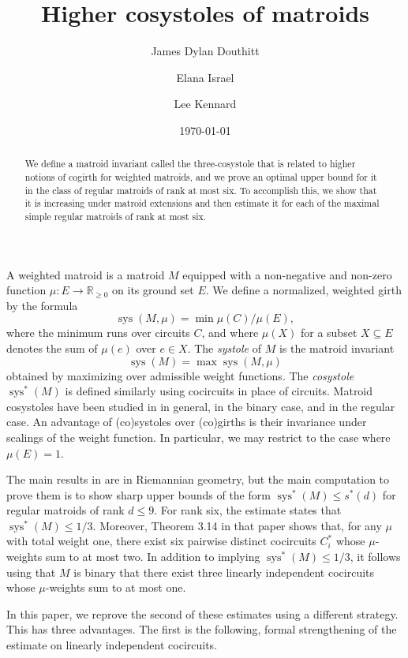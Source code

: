 \documentclass[reqno,12pt]{amsart}
\date{\today}
\title{Higher cosystoles of matroids}
\author{James Dylan Douthitt}
\author{Elana Israel}
\author{Lee Kennard}
\numberwithin{theorem}{section}
\theoremstyle{plain}
\theoremstyle{definition}
\theoremstyle{remark}
\numberwithin{equation}{section}
\numberwithin{table}{section}
\DeclareMathOperator{\sys}{sys}
\newcommand{\bR}{\mathbb{R}}
\begin{document}
\begin{abstract}
We define a matroid invariant called the three-cosystole that is related to higher notions of cogirth for weighted matroids, and we prove an optimal upper bound for it in the class of regular matroids of rank at most six. To accomplish this, we show that it is increasing under matroid extensions and then estimate it for each of the maximal simple regular matroids of rank at most six.
\end{abstract}

\maketitle

A weighted matroid is a matroid $M$ equipped with a non-negative and non-zero function $\mu:E \to \bR_{\geq 0}$ on its ground set $E$. We define a normalized, weighted girth by the formula
	\[\sys(M,\mu) = \min \mu(C)/\mu(E),\]
where the minimum runs over circuits $C$, and where $\mu(X)$ for a subset $X \subseteq E$ denotes the sum of $\mu(e)$ over $e \in X$. The {\it systole} of $M$ is the matroid invariant 
    \[\sys(M) = \max \sys(M, \mu)\]
obtained by maximizing over admissible weight functions. The {\it cosystole} $\sys^*(M)$ is defined similarly using cocircuits in place of circuits. Matroid cosystoles have been studied in \cite{ChoChenDing07} in general, \cite{CrenshawOxley23} in the binary case, and \cite{KWW2} in the regular case. An advantage of (co)systoles over (co)girths is their invariance under scalings of the weight function. In particular, we may restrict to the case where $\mu(E) = 1$.

The main results in \cite{KWW2} are in Riemannian geometry, but the main computation to prove them is to show sharp upper bounds of the form $\sys^*(M) \leq s^*(d)$ for regular matroids of rank $d \leq 9$. 
For rank six, the estimate states that $\sys^*(M) \leq 1/3$. Moreover, Theorem 3.14 in that paper shows that, for any $\mu$ with total weight one, there exist six pairwise distinct cocircuits $C_i^*$ whose $\mu$-weights sum to at most two. In addition to implying $\sys^*(M) \leq 1/3$, it follows using that $M$ is binary that there exist three linearly independent cocircuits whose $\mu$-weights sum to at most one.

In this paper, we reprove the second of these estimates using a different strategy. This has three advantages. The first is the following, formal strengthening of the estimate on linearly independent cocircuits.
\end{document}
